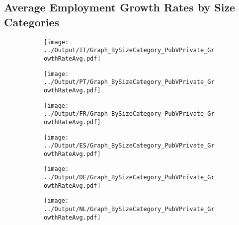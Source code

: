 \documentclass[12pt,notitlepage]{article}
\begin{document}
\clearpage


\subsection{Average Employment Growth Rates by Size Categories}
\begin{figure}[!htpb]
\centering
\begin{subfigure}{.49\textwidth}
    \centering
 \texttt{[image: ../Output/IT/Graph\_BySizeCategory\_PubVPrivate\_GrowthRateAvg.pdf]}
\end{subfigure}%
\begin{subfigure}{.49\textwidth}
    \centering
 \texttt{[image: ../Output/PT/Graph\_BySizeCategory\_PubVPrivate\_GrowthRateAvg.pdf]}
\end{subfigure}
\begin{subfigure}{.49\textwidth}
    \centering
 \texttt{[image: ../Output/FR/Graph\_BySizeCategory\_PubVPrivate\_GrowthRateAvg.pdf]}
\end{subfigure}%
\begin{subfigure}{.49\textwidth}
    \centering
 \texttt{[image: ../Output/ES/Graph\_BySizeCategory\_PubVPrivate\_GrowthRateAvg.pdf]}
\end{subfigure}
\begin{subfigure}{.49\textwidth}
    \centering
 \texttt{[image: ../Output/DE/Graph\_BySizeCategory\_PubVPrivate\_GrowthRateAvg.pdf]}
\end{subfigure}
\begin{subfigure}{.49\textwidth}
    \centering
 \texttt{[image: ../Output/NL/Graph\_BySizeCategory\_PubVPrivate\_GrowthRateAvg.pdf]}
\end{subfigure}
\end{figure}

\clearpage
\end{document}
